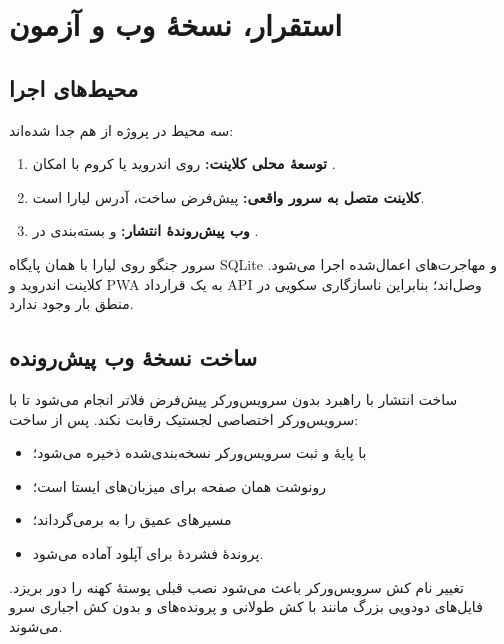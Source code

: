 \chapter[استقرار و آزمون]{استقرار، نسخهٔ وب و آزمون}

\section{محیط‌های اجرا}

سه محیط در پروژه از هم جدا شده‌اند:

\begin{enumerate}
  \item \textbf{توسعهٔ محلی کلاینت:}  روی اندروید یا کروم با امکان .
  \item \textbf{کلاینت متصل به سرور واقعی:} پیش‌فرض ساخت، آدرس لیارا است.
  \item \textbf{وب پیش‌روندهٔ انتشار:}  و بسته‌بندی در .
\end{enumerate}

سرور جنگو روی لیارا با همان پایگاه \textenglish{SQLite} و مهاجرت‌های اعمال‌شده اجرا می‌شود. کلاینت اندروید و \textenglish{PWA} به یک قرارداد \textenglish{API} وصل‌اند؛ بنابراین ناسازگاری سکویی در منطق بار وجود ندارد.

\section{ساخت نسخهٔ وب پیش‌رونده}

ساخت انتشار با راهبرد بدون سرویس‌ورکر پیش‌فرض فلاتر انجام می‌شود تا با سرویس‌ورکر اختصاصی لجستیک رقابت نکند. پس از ساخت:

\begin{itemize}
  \item {} با پایهٔ \en{/} و ثبت سرویس‌ورکر نسخه‌بندی‌شده ذخیره می‌شود؛
  \item {} رونوشت همان صفحه برای میزبان‌های ایستا است؛
  \item {} مسیرهای عمیق را به  برمی‌گرداند؛
  \item پروندهٔ فشردهٔ  برای آپلود آماده می‌شود.
\end{itemize}

تغییر نام کش سرویس‌ورکر باعث می‌شود نصب قبلی پوستهٔ کهنه را دور بریزد. فایل‌های دودویی بزرگ مانند  با کش طولانی و پرونده‌های  و  بدون کش اجباری سرو می‌شوند.

